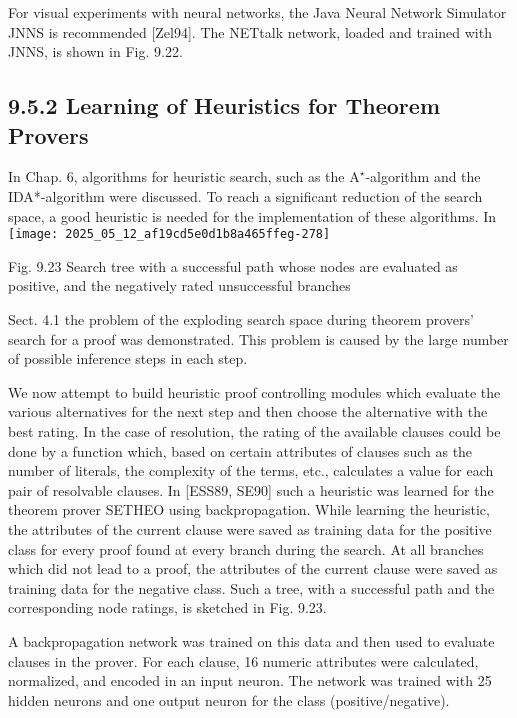 \documentclass[10pt]{article}
\begin{document}
For visual experiments with neural networks, the Java Neural Network Simulator JNNS is recommended [Zel94]. The NETtalk network, loaded and trained with JNNS, is shown in Fig. 9.22.

\subsection*{9.5.2 Learning of Heuristics for Theorem Provers}
In Chap. 6, algorithms for heuristic search, such as the $\mathrm{A}^{\star}$-algorithm and the IDA*-algorithm were discussed. To reach a significant reduction of the search space, a good heuristic is needed for the implementation of these algorithms. In\\
\texttt{[image: 2025\_05\_12\_af19cd5e0d1b8a465ffeg-278]}

Fig. 9.23 Search tree with a successful path whose nodes are evaluated as positive, and the negatively rated unsuccessful branches

Sect. 4.1 the problem of the exploding search space during theorem provers' search for a proof was demonstrated. This problem is caused by the large number of possible inference steps in each step.

We now attempt to build heuristic proof controlling modules which evaluate the various alternatives for the next step and then choose the alternative with the best rating. In the case of resolution, the rating of the available clauses could be done by a function which, based on certain attributes of clauses such as the number of literals, the complexity of the terms, etc., calculates a value for each pair of resolvable clauses. In [ESS89, SE90] such a heuristic was learned for the theorem prover SETHEO using backpropagation. While learning the heuristic, the attributes of the current clause were saved as training data for the positive class for every proof found at every branch during the search. At all branches which did not lead to a proof, the attributes of the current clause were saved as training data for the negative class. Such a tree, with a successful path and the corresponding node ratings, is sketched in Fig. 9.23.

A backpropagation network was trained on this data and then used to evaluate clauses in the prover. For each clause, 16 numeric attributes were calculated, normalized, and encoded in an input neuron. The network was trained with 25 hidden neurons and one output neuron for the class (positive/negative).
\end{document}
